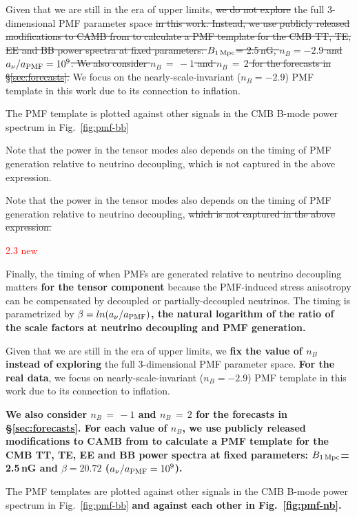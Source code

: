 \documentclass{article}
\newcommand{\bpmf}{\ensuremath{B_{\rm 1\,Mpc}}}
\newcommand{\changed}[1]{\textcolor{Red}{#1}}
\newcommand{\removed}[1]{\st{#1}}
\newcommand{\added}[1]{\textbf{#1}}
\begin{document}
Given that we are still in the era of upper limits, \removed{we do not explore} the full 3-dimensional PMF parameter space \removed{in this work. 
Instead, we use publicly released modifications to CAMB from \citet{zucca16} to calculate a PMF template for the CMB TT, TE, EE and BB power spectra at fixed parameters: \bpmf = 2.5\,nG, $n_B = -2.9$ and $a_{\nu}/a_{\rm{PMF}} = 10^9$. 
We also consider $n_B\,=\,-1$ and $n_B\,=\,2$ for the forecasts in \S\ref{sec:forecasts}.}
We focus on the nearly-scale-invariant ($n_B = -2.9$) PMF template in this work due to its connection to inflation.

The PMF template is plotted against other signals in the CMB B-mode power spectrum in Fig.~\ref{fig:pmf-bb}

Note that the power in the tensor modes also depends on the timing of PMF generation relative to neutrino decoupling, which is not captured in the above expression.

Note that the power in the tensor modes also depends on the timing of PMF generation relative to neutrino decoupling, \removed{which is not captured in the above expression.}

\changed{2.3 new}

Finally, the timing of when PMFs are generated relative to neutrino decoupling matters \added{for the tensor component} because the PMF-induced stress anisotropy can be compensated by decoupled or partially-decoupled neutrinos. 
The timing is  parametrized by \added{$\beta = ln(a_{\nu}/a_{\rm{PMF}})$,  the natural logarithm of the ratio of the scale factors at neutrino decoupling and PMF generation.}

Given that we are still in the era of upper limits, we \added{fix the value of $n_B$ instead of exploring} the full 3-dimensional PMF parameter space. 
\added{For the real data}, we focus on nearly-scale-invariant ($n_B = -2.9$) PMF template in this work due to its connection to inflation.

\added{We also consider $n_B\,=\,-1$ and $n_B\,=\,2$ for the forecasts in \S\ref{sec:forecasts}. 
For each value of $n_B$, we use publicly released modifications to CAMB from \citet{zucca16} to calculate a PMF template for the CMB TT, TE, EE and BB power spectra at fixed parameters: \bpmf = 2.5\,nG and $\beta=20.72$ ($a_{\nu}/a_{\rm{PMF}} = 10^9$).}

The PMF templates are plotted against other signals in the CMB B-mode power spectrum in Fig.~\ref{fig:pmf-bb} \added{and against each other in Fig.~\ref{fig:pmf-nb}. }
\end{document}
